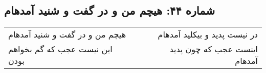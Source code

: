 \begin{center}
\section*{شماره ۴۴: هیچم من و در گفت و شنید آمدهام}
\label{sec:044}
\begin{longtable}{l p{0.5cm} r}
هیچم من و در گفت و شنید آمدهام
&&
در نیست پدید و بیکلید آمدهام
\\
این نیست عجب که گم بخواهم بودن
&&
اینست عجب که چون پدید آمدهام
\\
\end{longtable}
\end{center}
